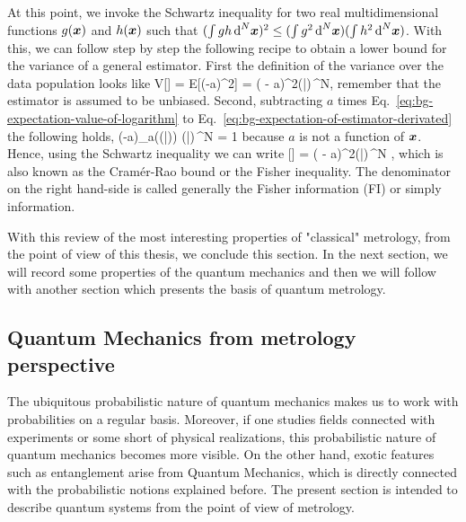 At this point, we invoke the Schwartz inequality for two real multidimensional functions $g(\boldsymbol{x})$ and $h(\boldsymbol{x})$ such that $(\int g h \,\text{d}^N\boldsymbol{x})^2\leq (\int g^2 \,\text{d}^N\boldsymbol{x}) (\int h^2 \,\text{d}^N\boldsymbol{x})$.
With this, we can follow step by step the following recipe to obtain a lower bound for the variance of a general estimator.
First the definition of the variance over the data population looks like
\be
  V[] = E[(-a)^2] = \int ( - a)^2\prob(|)\,^N,
\ee
remember that the estimator is assumed to be unbiased.
Second, subtracting $a$ times Eq.~\eqref{eq:bg-expectation-value-of-logarithm} to Eq.~\eqref{eq:bg-expectation-of-estimator-derivated} the following holds,
\be
  \int (-a)\partial_a\big(\ln  \prob(|)\big) \prob(|)\,^N = 1
\ee
because $a$ is not a function of $\boldsymbol{x}$.
Hence, using the Schwartz inequality we can write
\be
  \label{eq:bg-classical-cr-bound-and-fi}
  [] = \int ( - a)^2\prob(|)\,^N \geq {},
\ee
which is also known as the Cram\'er-Rao bound or the Fisher inequality.
The denominator on the right hand-side is called generally the Fisher information (FI) or simply information.

With this review of the most interesting properties of "classical" metrology, from the point of view of this thesis, we conclude this section.
In the next section, we will record some properties of the quantum mechanics and then we will follow with another section which presents the basis of quantum metrology.

\subsection{Quantum Mechanics from metrology perspective}
\label{sec:bg-quantum-mechanics-for-metrology}

The ubiquitous probabilistic nature of quantum mechanics makes us to work with probabilities on a regular basis.
Moreover, if one studies fields connected with experiments or some short of physical realizations, this probabilistic nature of quantum mechanics becomes more visible.
On the other hand, exotic features such as entanglement arise from Quantum Mechanics, which is directly connected with the probabilistic notions explained before.
The present section is intended to describe quantum systems from the point of view of metrology.

